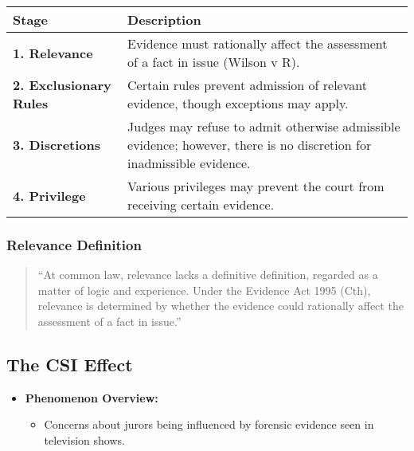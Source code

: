 \begin{longtable}[]{@{}
  >{\raggedright\arraybackslash}p{}
  >{\raggedright\arraybackslash}p{}@{}}
\toprule\noalign{}
\begin{minipage}[b]{\linewidth}\raggedright
Stage
\end{minipage} & \begin{minipage}[b]{\linewidth}\raggedright
Description
\end{minipage} \\
\midrule\noalign{}
\endhead
\bottomrule\noalign{}
\endlastfoot
\textbf{1. Relevance} & Evidence must rationally affect the assessment
of a fact in issue (Wilson v R). \\
\textbf{2. Exclusionary Rules} & Certain rules prevent admission of
relevant evidence, though exceptions may apply. \\
\textbf{3. Discretions} & Judges may refuse to admit otherwise
admissible evidence; however, there is no discretion for inadmissible
evidence. \\
\textbf{4. Privilege} & Various privileges may prevent the court from
receiving certain evidence. \\
\end{longtable}

\subsubsection{Relevance Definition}\label{relevance-definition}

\begin{quote}
``At common law, relevance lacks a definitive definition, regarded as a
matter of logic and experience. Under the Evidence Act 1995 (Cth),
relevance is determined by whether the evidence could rationally affect
the assessment of a fact in issue.''
\end{quote}

\subsection{  The CSI Effect}\label{the-csi-effect}

\begin{itemize}
\tightlist
\item
  \textbf{Phenomenon Overview:}

  \begin{itemize}
  \tightlist
  \item
    Concerns about jurors being influenced by forensic evidence seen in
    television shows.
  \end{itemize}
\end{itemize}

